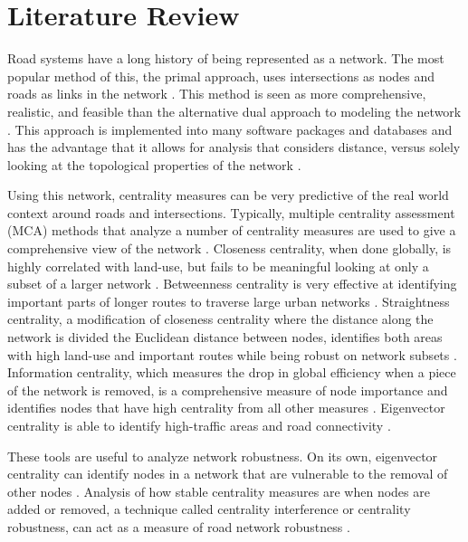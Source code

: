 \documentclass[11pt]{article}
\numberwithin{equation}{section} %
\numberwithin{figure}{section} %
\numberwithin{table}{section} %
\theoremstyle{definition}
\begin{document}
\section{Literature Review} \label{sec:lit_review}

Road systems have a long history of being represented as a network. The most popular method of this, the primal approach, uses intersections as nodes and roads as links in the network \parencites{Porta06}{Ding19}. This method is seen as more comprehensive, realistic, and feasible than the alternative dual approach to modeling the network \parencites{Porta06}{Porta06b}. This approach is implemented into many software packages and databases \parencites{Esri}{Boeing17} and has the advantage that it allows for analysis that considers distance, versus solely looking at the topological properties of the network \parencites{Ding19}{Erath09}{Wang11}{Barthelemy09}.

Using this network, centrality measures can be very predictive of the real world context around roads and intersections. Typically, multiple centrality assessment (MCA) methods that analyze a number of centrality measures are used to give a comprehensive view of the network \parencites{Porta06}{Porta07}. Closeness centrality, when done globally, is highly correlated with land-use, but fails to be meaningful looking at only a subset of a larger network \parencites{Wang11}{Porta06}{Barthelemy09}. Betweenness centrality is very effective at identifying important parts of longer routes to traverse large urban networks \parencite{Porta06}. Straightness centrality, a modification of closeness centrality where the distance along the network is divided the Euclidean distance between nodes, identifies both areas with high land-use and important routes while being robust on network subsets \parencites{Porta06}{Wang11}. Information centrality, which measures the drop in global efficiency when a piece of the network is removed, is a comprehensive measure of node importance and identifies nodes that have high centrality from all other measures \cite{Porta06}. Eigenvector centrality is able to identify high-traffic areas and road connectivity \parencites{Jayaweera17}{Ando21}.

These tools are useful to analyze network robustness. On its own, eigenvector centrality can identify nodes in a network that are vulnerable to the removal of other nodes \parencite{Ando20}. Analysis of how stable centrality measures are when nodes are added or removed, a technique called centrality interference or centrality robustness, can act as a measure of road network robustness \parencite{Scardoni13}.
\end{document}
